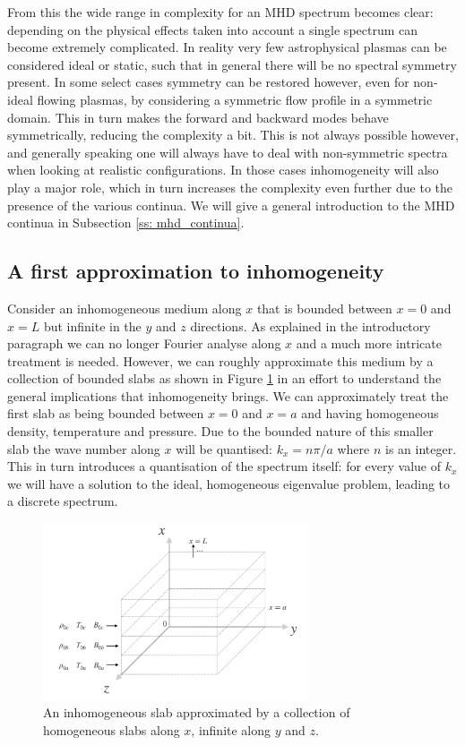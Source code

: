 From this the wide range in complexity for an MHD spectrum becomes clear: depending on the physical effects taken into account a single spectrum can become extremely complicated. In reality very few astrophysical plasmas can be considered ideal or static, such that in general there will be no spectral symmetry present. In some select cases symmetry can be restored however, even for non-ideal flowing plasmas, by considering a symmetric flow profile in a symmetric domain. This in turn makes the forward and backward modes behave symmetrically, reducing the complexity a bit. This is not always possible however, and generally speaking one will always have to deal with non-symmetric spectra when looking at realistic configurations. In those cases inhomogeneity will also play a major role, which in turn increases the complexity even further due to the presence of the various continua. We will give a general introduction to the MHD continua in Subsection \ref{ss: mhd_continua}.


\subsection{A first approximation to inhomogeneity}
Consider an inhomogeneous medium along $x$ that is bounded between $x = 0$ and $x = L$ but infinite in the $y$ and $z$ directions. As explained in the introductory paragraph we can no longer Fourier analyse along $x$ and a much more intricate treatment is needed. However, we can roughly approximate this medium by a collection of bounded slabs as shown in Figure \ref{fig: bounded_slab} in an effort to understand the general implications that inhomogeneity brings. We can approximately treat the first slab as being bounded between $x = 0$ and $x = a$ and having homogeneous density, temperature and pressure. Due to the bounded nature of this smaller slab the wave number along $x$ will be quantised: $k_x = n\pi / a$ where $n$ is an integer. This in turn introduces a quantisation of the spectrum itself: for every value of $k_x$ we will have a solution to the ideal, homogeneous eigenvalue problem, leading to a discrete spectrum.

\begin{figure}[b]
  \centering
  \includegraphics[width=0.7\textwidth]{confined_slab.png}
  \caption{
    An inhomogeneous slab approximated by a collection of homogeneous slabs along $x$, infinite along $y$ and $z$.
  }
  \label{fig: bounded_slab}
\end{figure}

